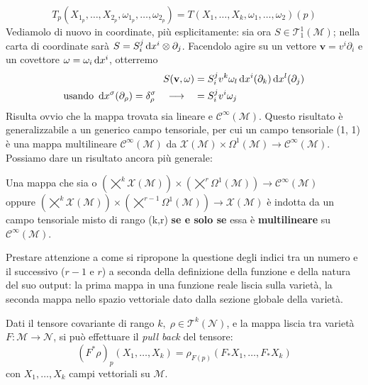 \begin{equation}
    T_p(X_{1_p}, \dots, X_{2_p}, \omega_{1_p}, \dots, \omega_{2_p}) = T(X_{1}, \dots, X_{k}, \omega_{1}, \dots, \omega_{2}) (p)
\end{equation}
Vediamolo di nuovo in coordinate, più esplicitamente: sia ora $S \in \mathcal{T}_1^1(\mathcal{M})$; nella carta di coordinate sarà $S= S^j_i \odif{x^i} \otimes \partial_j$.
Facendolo agire su un vettore $\mathbf{v}= v^i \partial_i$ e un covettore $\omega = \omega_i \odif{x^i}$, otterremo
\begin{align*}
    S(\mathbf{v}, \omega)                                                                        & = S^j_i v^k \omega_l \odif{x^i} (\partial_k) \odif{x^l} (\partial_j) \\
    \text{usando } \odif{x^\sigma}(\partial_\rho)=\delta_\rho^\sigma \quad \longrightarrow \quad & = S_i^j v^i \omega_j
\end{align*}
Risulta ovvio che la mappa trovata sia lineare e $\mathcal{C}^\infty (\mathcal{M})$.
Questo risultato è generalizzabile a un generico campo tensoriale, per cui un campo tensoriale (1, 1) è una mappa multilineare $\mathcal{C}^\infty (\mathcal{M})$ da $\mathcal{X}(\mathcal{M}) \times \Omega^1(\mathcal{M}) \longrightarrow \mathcal{C}^\infty (\mathcal{M})$.
Possiamo dare un risultato ancora più generale:
\begin{lemma}
    Una mappa che sia o $\left( \bigtimes^k \mathcal{X}(\mathcal{M}) \right) \times \left( \bigtimes^r \Omega^1(\mathcal{M}) \right) \longrightarrow \mathcal{C}^\infty (\mathcal{M})$ \\
    oppure $\left(\bigtimes^k \mathcal{X}(\mathcal{M})\right) \times \left(\bigtimes^{r-1} \Omega^1(\mathcal{M})\right) \longrightarrow \mathcal{X}(\mathcal{M})$ è indotta da un campo tensoriale misto di rango (k,r) \textbf{se e solo se} essa è \textbf{multilineare} su $\mathcal{C}^\infty (\mathcal{M})$.
\end{lemma}
Prestare attenzione a come si ripropone la questione degli indici tra un numero e il successivo ($r-1$ e $r$) a seconda della definizione della funzione e della natura del suo output: la prima mappa in una funzione reale liscia sulla varietà, la seconda mappa nello spazio vettoriale dato dalla sezione globale della varietà.

Dati il tensore covariante di rango $k, \; \rho \in \mathcal{T}^k(\mathcal{N})$, e la mappa  liscia tra varietà $F : \mathcal{M} \longrightarrow \mathcal{N}$, si può effettuare il \emph{pull back} del tensore:
\[
    (F^* \rho)_p (X_1, \dots, X_k) = \rho_{F(p)} (F_*X_1, \dots, F_*X_k)
\]
con $X_1, \dots, X_k$ campi vettoriali su $\mathcal{M}$.

